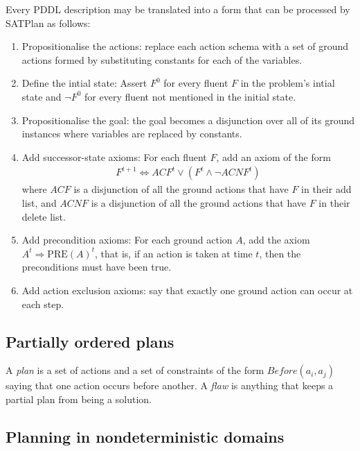 \documentclass{article}
\begin{document}
\begin{theorem}
    Every PDDL description may be translated into a form that can be
    processed by SATPlan as follows:
    \begin{enumerate}
        \item Propositionalise the actions: replace each action schema with a set of ground actions
              formed by substituting constants for each of the variables.
        \item Define the intial state: Assert $F^0$ for every fluent $F$ in the problem's intial state
              and $\neg F^0$ for every fluent not mentioned in the initial state.
        \item Propositionalise the goal: the goal becomes a disjunction over all of its ground instances
              where variables are replaced by constants.
        \item Add successor-state axioms: For each fluent $F$, add an axiom of the form \begin{align*}
            F^{t+1} \Leftrightarrow ACF^t \vee (F^t \wedge \neg ACNF^t)
        \end{align*} 
        where $ACF$ is a disjunction of all the ground actions that have $F$ in
        their add list, and $ACNF$ is a disjunction of all the ground actions that have $F$
        in their delete list.
        \item Add precondition axioms: For each ground action $A$, add the axiom $A^t\Rightarrow\text{PRE}(A)^t$,
              that is, if an action is taken at time $t$, then the preconditions must have been true.
        \item Add action exclusion axioms: say that exactly one ground action can occur at each step.
    \end{enumerate}
\end{theorem}

\subsection{Partially ordered plans}

\begin{definition}
    A \emph{plan} is a set of actions and a set of constraints of the form $Before(a_i, a_j)$ saying
    that one action occurs before another. A \emph{flaw} is anything that keeps a partial plan from
    being a solution. 
\end{definition}

\subsection{Planning in nondeterministic domains}
\end{document}

